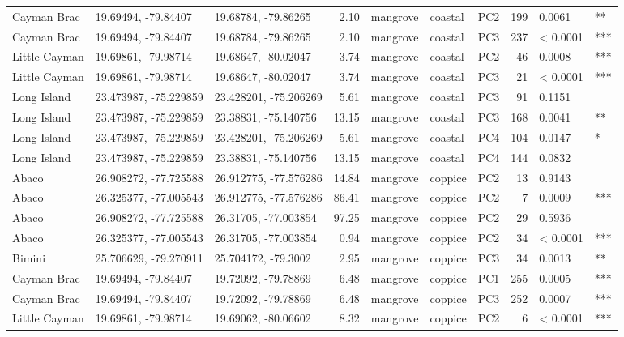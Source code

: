 \begin{table}[H]
\begin{tabular}{l|l|l|r|l|l|l|r|l|l}
        Cayman Brac & 19.69494, -79.84407 & 19.68784, -79.86265 & 2.10 & mangrove & coastal & PC2 & 199 & 0.0061 & **\\
        Cayman Brac & 19.69494, -79.84407 & 19.68784, -79.86265 & 2.10 & mangrove & coastal & PC3 & 237 & < 0.0001 & ***\\
        Little Cayman & 19.69861, -79.98714 & 19.68647, -80.02047 & 3.74 & mangrove & coastal & PC2 & 46 & 0.0008 & ***\\
        Little Cayman & 19.69861, -79.98714 & 19.68647, -80.02047 & 3.74 & mangrove & coastal & PC3 & 21 & < 0.0001 & ***\\
        Long Island & 23.473987, -75.229859 & 23.428201, -75.206269 & 5.61 & mangrove & coastal & PC3 & 91 & 0.1151 & \\
        Long Island & 23.473987, -75.229859 & 23.38831, -75.140756 & 13.15 & mangrove & coastal & PC3 & 168 & 0.0041 & **\\
        Long Island & 23.473987, -75.229859 & 23.428201, -75.206269 & 5.61 & mangrove & coastal & PC4 & 104 & 0.0147 & *\\
        Long Island & 23.473987, -75.229859 & 23.38831, -75.140756 & 13.15 & mangrove & coastal & PC4 & 144 & 0.0832 & \\
        Abaco & 26.908272, -77.725588 & 26.912775, -77.576286 & 14.84 & mangrove & coppice & PC2 & 13 & 0.9143 & \\
        Abaco & 26.325377, -77.005543 & 26.912775, -77.576286 & 86.41 & mangrove & coppice & PC2 & 7 & 0.0009 & ***\\
        Abaco & 26.908272, -77.725588 & 26.31705, -77.003854 & 97.25 & mangrove & coppice & PC2 & 29 & 0.5936 & \\
        Abaco & 26.325377, -77.005543 & 26.31705, -77.003854 & 0.94 & mangrove & coppice & PC2 & 34 & < 0.0001 & ***\\
        Bimini & 25.706629, -79.270911 & 25.704172, -79.3002 & 2.95 & mangrove & coppice & PC3 & 34 & 0.0013 & **\\
        Cayman Brac & 19.69494, -79.84407 & 19.72092, -79.78869 & 6.48 & mangrove & coppice & PC1 & 255 & 0.0005 & ***\\
        Cayman Brac & 19.69494, -79.84407 & 19.72092, -79.78869 & 6.48 & mangrove & coppice & PC3 & 252 & 0.0007 & ***\\
        Little Cayman & 19.69861, -79.98714 & 19.69062, -80.06602 & 8.32 & mangrove & coppice & PC2 & 6 & < 0.0001 & ***\\
    \end{tabular}
    \label{suptab:distances}
\end{table}

